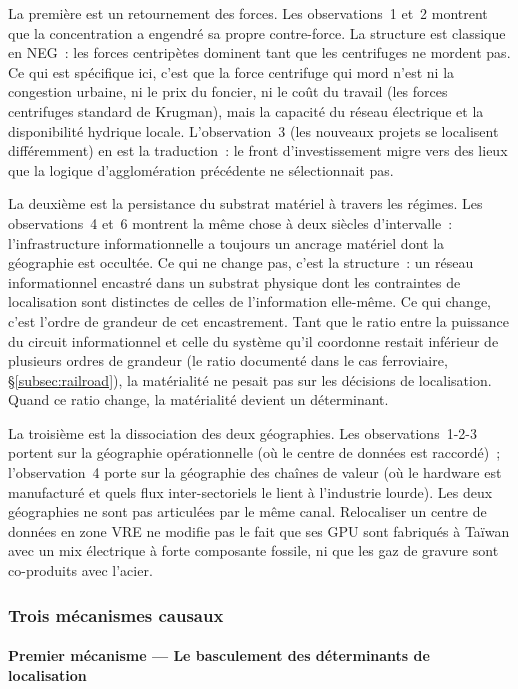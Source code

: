 La première est un retournement des forces. Les observations~1 et~2 montrent que la concentration a engendré sa propre contre-force. La structure est classique en NEG~: les forces centripètes dominent tant que les centrifuges ne mordent pas. Ce qui est spécifique ici, c'est que la force centrifuge qui mord n'est ni la congestion urbaine, ni le prix du foncier, ni le coût du travail (les forces centrifuges standard de Krugman), mais la capacité du réseau électrique et la disponibilité hydrique locale. L'observation~3 (les nouveaux projets se localisent différemment) en est la traduction~: le front d'investissement migre vers des lieux que la logique d'agglomération précédente ne sélectionnait pas.

La deuxième est la persistance du substrat matériel à travers les régimes. Les observations~4 et~6 montrent la même chose à deux siècles d'intervalle~: l'infrastructure informationnelle a toujours un ancrage matériel dont la géographie est occultée. Ce qui ne change pas, c'est la structure~: un réseau informationnel encastré dans un substrat physique dont les contraintes de localisation sont distinctes de celles de l'information elle-même. Ce qui change, c'est l'ordre de grandeur de cet encastrement. Tant que le ratio entre la puissance du circuit informationnel et celle du système qu'il coordonne restait inférieur de plusieurs ordres de grandeur (le ratio documenté dans le cas ferroviaire, §\ref{subsec:railroad}), la matérialité ne pesait pas sur les décisions de localisation. Quand ce ratio change, la matérialité devient un déterminant.

La troisième est la dissociation des deux géographies. Les observations~1-2-3 portent sur la géographie opérationnelle (où le centre de données est raccordé)~; l'observation~4 porte sur la géographie des chaînes de valeur (où le hardware est manufacturé et quels flux inter-sectoriels le lient à l'industrie lourde). Les deux géographies ne sont pas articulées par le même canal. Relocaliser un centre de données en zone VRE ne modifie pas le fait que ses GPU sont fabriqués à Taïwan avec un mix électrique à forte composante fossile, ni que les gaz de gravure sont co-produits avec l'acier.


\subsubsection{Trois mécanismes causaux}

\paragraph{Premier mécanisme --- Le basculement des déterminants de localisation}

